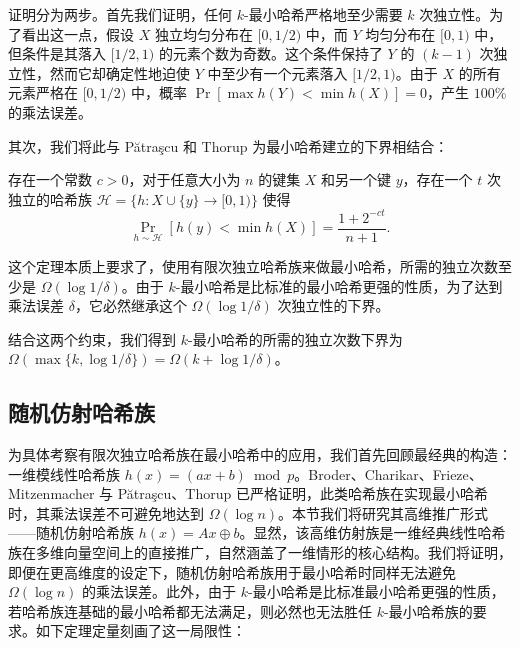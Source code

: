证明分为两步。首先我们证明，任何 $k$-最小哈希严格地至少需要 $k$ 次独立性。为了看出这一点，假设 $X$ 独立均匀分布在 $[0, 1/2)$ 中，而 $Y$ 均匀分布在 $[0, 1)$ 中，但条件是其落入 $[1/2, 1)$ 的元素个数为奇数。这个条件保持了 $Y$ 的 $(k-1)$ 次独立性，然而它却确定性地迫使 $Y$ 中至少有一个元素落入 $[1/2, 1)$。由于 $X$ 的所有元素严格在 $[0, 1/2)$ 中，概率 $\Pr[\max h(Y) < \min h(X)] = 0$，产生 $100\%$ 的乘法误差。

其次，我们将此与 P{\u{a}}tra{\c{s}}cu 和 Thorup \cite{PT_lb_t_wise_min_wise} 为最小哈希建立的下界相结合：

\begin{theorem}\label{thm:PT_lb_t_wise_min_wise}
    存在一个常数 $c > 0$，对于任意大小为 $n$ 的键集 $X$ 和另一个键 $y$，存在一个 $t$ 次独立的哈希族 $\mathcal{H} = \{h : X \cup \{y\} \to [0, 1)\}$ 使得
    $$
    \Pr_{h \sim \mathcal{H}}[h(y) < \min h(X)] = \frac{1 + 2^{-c t}}{n + 1}.
    $$
\end{theorem}

这个定理本质上要求了，使用有限次独立哈希族来做最小哈希，所需的独立次数至少是 $\Omega(\log 1 / \delta)$。由于 $k$-最小哈希是比标准的最小哈希更强的性质，为了达到乘法误差 $\delta$，它必然继承这个 $\Omega(\log 1 / \delta)$ 次独立性的下界。

结合这两个约束，我们得到 $k$-最小哈希的所需的独立次数下界为 $\Omega(\max\{k, \log 1 / \delta\}) = \Omega(k + \log 1 / \delta)$。

\subsection{随机仿射哈希族}\label{sec:affine_hash}

为具体考察有限次独立哈希族在最小哈希中的应用，我们首先回顾最经典的构造：一维模线性哈希族 $h(x) = (ax + b) \bmod p$。Broder、Charikar、Frieze、Mitzenmacher \cite{BCFM98} 与 P{\u{a}}tra{\c{s}}cu、Thorup \cite{PT_lb_t_wise_min_wise} 已严格证明，此类哈希族在实现最小哈希时，其乘法误差不可避免地达到 $\Omega(\log n)$。本节我们将研究其高维推广形式——随机仿射哈希族 $h(x) = Ax \oplus b$。显然，该高维仿射族是一维经典线性哈希族在多维向量空间上的直接推广，自然涵盖了一维情形的核心结构。我们将证明，即便在更高维度的设定下，随机仿射哈希族用于最小哈希时同样无法避免 $\Omega(\log n)$ 的乘法误差。此外，由于 $k$-最小哈希是比标准最小哈希更强的性质，若哈希族连基础的最小哈希都无法满足，则必然也无法胜任 $k$-最小哈希族的要求。如下定理定量刻画了这一局限性：

\newcommand{\msb}{\mathsf{msb}}

